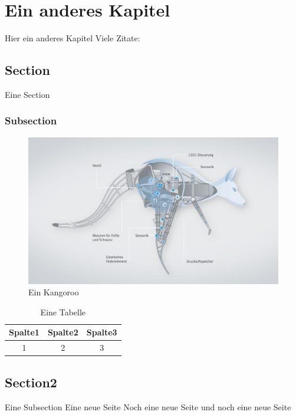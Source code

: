 \chapter{Ein anderes Kapitel}
    Hier ein anderes Kapitel
    Viele Zitate: \cite{patterson} \cite{krizhevsky} \cite{matlab} \cite{pitts} \cite{lawrence} \cite{miesbach}
    \section{Section}
        Eine Section
        \subsection{Subsection}
            \begin{figure}[h]
                \includegraphics[scale=0.2]{Abbildungen/Kapitel2/Kangoroo.png}
                \centering
                \caption{Ein Kangoroo}
                \label{Abb:Kangoroo}   
            \end{figure}  
             \begin{table}[h]
                \begin{tabular}{ccc}
                      \hline
                      Spalte1 & Spalte2 & Spalte3\\                      
                      \hline
                      1 & 2 & 3\\
                      \hline
                \end{tabular}
                \centering
                \caption{Eine Tabelle}
                \label{Tab:Tabelle1}
            \end{table}
 
        
        
    \section{Section2}
        Eine Subsection
        \newpage
        Eine neue Seite
        \newpage 
        Noch eine neue Seite
        \newpage    
        und noch eine neue Seite